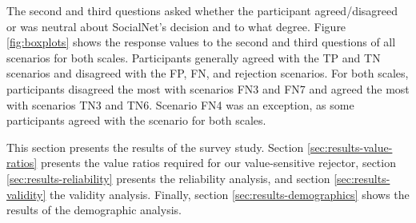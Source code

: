 %
The second and third questions asked whether the participant agreed/disagreed or was neutral about SocialNet's decision and to what degree.
%
Figure \ref{fig:boxplots} shows the response values to the second and third questions of all scenarios for both scales.
%
Participants generally agreed with the TP and TN scenarios and disagreed with the FP, FN, and rejection scenarios.
%
For both scales, participants disagreed the most with scenarios FN3 and FN7 and agreed the most with scenarios TN3 and TN6.
%
Scenario FN4 was an exception, as some participants agreed with the scenario for both scales.
%

%
This section presents the results of the survey study.
%
Section \ref{sec:results-value-ratios} presents the value ratios required for our value-sensitive rejector, section \ref{sec:results-reliability} presents the reliability analysis, and section \ref{sec:results-validity} the validity analysis.
%
Finally, section \ref{sec:results-demographics} shows the results of the demographic analysis.
%

